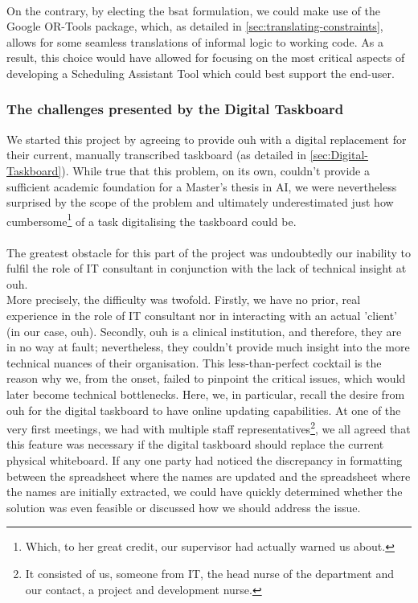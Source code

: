 \\
On the contrary, by electing the \acrshort{bsat} formulation, we could make use of the Google OR-Tools package, which, as detailed in \autoref{sec:translating-constraints}, allows for some seamless translations of informal logic to working code. As a result, this choice would have allowed for focusing on the most critical aspects of developing a Scheduling Assistant Tool which could best support the end-user.

\subsubsection*{The challenges presented by the Digital Taskboard}
We started this project by agreeing to provide \acrshort{ouh} with a digital replacement for their current, manually transcribed taskboard (as detailed in \autoref{sec:Digital-Taskboard}). While true that this problem, on its own, couldn't provide a sufficient academic foundation for a Master's thesis in AI, we were nevertheless surprised by the scope of the problem and ultimately underestimated just how cumbersome\footnote{Which, to her great credit, our supervisor had actually warned us about.} of a task digitalising the taskboard could be.
\\
\\
The greatest obstacle for this part of the project was undoubtedly our inability to fulfil the role of IT consultant in conjunction with the lack of technical insight at \acrshort{ouh}.
\\
More precisely, the difficulty was twofold. Firstly, we have no prior, real experience in the role of IT consultant nor in interacting with an actual 'client' (in our case, \acrshort{ouh}). Secondly, \acrshort{ouh} is a clinical institution, and therefore, they are in no way at fault; nevertheless, they couldn't provide much insight into the more technical nuances of their organisation. This less-than-perfect cocktail is the reason why we, from the onset, failed to pinpoint the critical issues, which would later become technical bottlenecks. Here, we, in particular, recall the desire from \acrshort{ouh} for the digital taskboard to have online updating capabilities. At one of the very first meetings, we had with multiple staff representatives\footnote{It consisted of us, someone from IT, the head nurse of the department and our contact, a project and development nurse.}, we all agreed that this feature was necessary if the digital taskboard should replace the current physical whiteboard. If any one party had noticed the discrepancy in formatting between the spreadsheet where the names are updated and the spreadsheet where the names are initially extracted, we could have quickly determined whether the solution was even feasible or discussed how we should address the issue.

